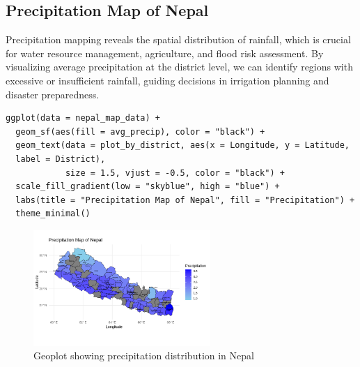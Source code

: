 \subsection*{Precipitation Map of Nepal}

Precipitation mapping reveals the spatial distribution of rainfall, which is crucial for water resource management, agriculture, and flood risk assessment. By visualizing average precipitation at the district level, we can identify regions with excessive or insufficient rainfall, guiding decisions in irrigation planning and disaster preparedness.

\begin{verbatim}
ggplot(data = nepal_map_data) +
  geom_sf(aes(fill = avg_precip), color = "black") +  
  geom_text(data = plot_by_district, aes(x = Longitude, y = Latitude, 
  label = District),
            size = 1.5, vjust = -0.5, color = "black") +
  scale_fill_gradient(low = "skyblue", high = "blue") +  
  labs(title = "Precipitation Map of Nepal", fill = "Precipitation") +
  theme_minimal()
\end{verbatim}

\begin{figure}[h]
\centering
\includegraphics[width=0.6\textwidth]{figures/geo_precip.png}
\caption{Geoplot showing precipitation distribution in Nepal}
\label{fig:precip_map_nepal}
\end{figure}
